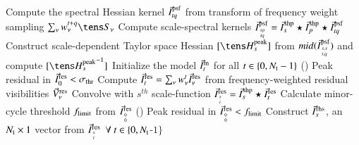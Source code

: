 \documentclass[11pt,a4paper,variablewidth]{article}
\begin{document}
\begin{algorithm}
  {
{\color{red}        { Compute the spectral Hessian kernel $\vec{I}^{\rm psf}_{tq}$ from transform of frequency weight sampling } $\sum_{\nu} \wntq \Sa_{\nu}$\;}
	{
		{Compute scale-spectral kernels} $\vec{I}^{\rm psf}_{{sp}\atop{tq}} = \vec{I}^{\rm shp}_s \star \vec{I}^{\rm shp}_p \star \vec{I}^{\rm psf}_{tq} $\;
	}
  }
  {
     Construct scale-dependent Taylor space Hessian $[{\He^{\rm peak}_s}]$ from $mid({\vec{I}}^{\rm psf}_{{s,s}\atop{t,q}})$ and compute $[{\He^{\rm peak}_s}^{-1}]$\;
  }
  Initialize the model $\vec{I}^{\rm m}_t$ for all $t \in \{0,N_{\rm t} -1\}$\; %
  \Repeat () { Peak residual in $\vec{I}^{\rm res}_0 < \sigma_{\rm thr}$ }
  {
    {
{\color{red}      Compute $\vec{I}^{\rm res}_t = \sum_{\nu} {w_{\nu}^t} \vec{I}^{\rm res}_{\nu}$ from frequency-weighted residual visibilities $\vec{V}^{\rm res}_{\nu}$\;}
      {
	    Convolve with $s^{th}$ scale-function $\vec{I}^{\rm res}_{{s}\atop{t}} = \vec{I}^{\rm shp}_s \star \vec{I}^{\rm res}_t$
      }
    }
    Calculate minor-cycle threshold $f_{\rm limit}$ from $\vec{I}^{\rm res}_{{0}\atop{0}}$\;
    \Repeat (){ Peak residual in $\vec{I}^{\rm res}_{{0}\atop{0}} < f_{\rm limit} $ } 
    {
     {
       {
          Construct ${\vec{I}}^{\rm rhs}_s$, an $N_{\rm t} \times 1$ vector from ${\vec{I}}^{\rm res}_{{s}\atop{t}} ~~\forall ~ t \in \{0,N_{\rm t} $-$1\}$\;
}}}}
\end{algorithm}
\end{document}
